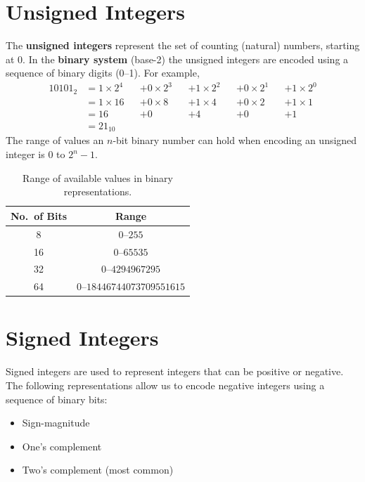\documentclass[a4paper]{report}
\begin{document}
\section{Unsigned Integers}
The \textbf{unsigned integers} represent the set of counting (natural) numbers, starting at 0.
In the \textbf{binary system} (base-2) the unsigned integers are encoded using a sequence of binary digits (0--1).
For example,
\begin{align*}
    10101_2 & = 1 \times 2^4 &  & + 0 \times 2^3 &  & + 1 \times 2^2 &  & + 0 \times 2^1 &  & + 1 \times 2^0 \\
            & = 1 \times 16  &  & + 0 \times 8   &  & + 1 \times 4   &  & + 0 \times 2   &  & + 1 \times 1   \\
            & = 16           &  & + 0            &  & + 4            &  & + 0            &  & + 1            \\
            & = 21_{10}
\end{align*}
The range of values an \(n\)-bit binary number can hold when encoding an unsigned integer is 0 to \(2^n - 1\).
\begin{table}[H]
    \centering
    \begin{tabular}{c c}
        \toprule
        \textbf{No.\ of Bits} & \textbf{Range}                        \\
        \midrule
        8                     & \(0\)--\(255\)                        \\
        16                    & \(0\)--\(\num{65535}\)                \\
        32                    & \(0\)--\(\num{4294967295}\)           \\
        64                    & \(0\)--\(\num{18446744073709551615}\) \\
        \bottomrule
    \end{tabular}
    \caption{Range of available values in binary representations.} %
\end{table}
\section{Signed Integers}
Signed integers are used to represent integers that can be positive or negative.
The following representations allow us to encode negative integers using a sequence of binary bits:
\begin{itemize}
    \item Sign-magnitude
    \item One's complement
    \item Two's complement (most common)
\end{itemize}
\end{document}
